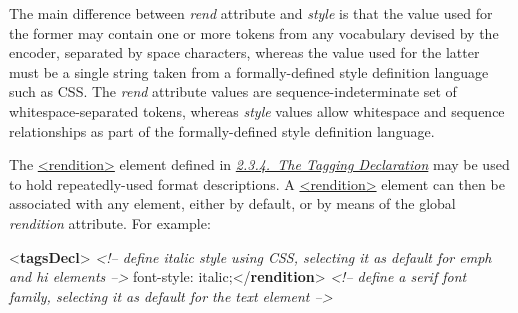 The main difference between {\itshape rend} attribute and {\itshape style} is that the value used for the former may contain one or more tokens from any vocabulary devised by the encoder, separated by space characters, whereas the value used for the latter must be a single string taken from a formally-defined style definition language such as CSS. The {\itshape rend} attribute values are sequence-indeterminate set of whitespace-separated tokens, whereas {\itshape style} values allow whitespace and sequence relationships as part of the formally-defined style definition language.\par
The \hyperref[TEI.rendition]{<rendition>} element defined in \textit{\hyperref[HD57]{2.3.4.\ The Tagging Declaration}} may be used to hold repeatedly-used format descriptions. A \hyperref[TEI.rendition]{<rendition>} element can then be associated with any element, either by default, or by means of the global {\itshape rendition} attribute. For example: \par\bgroup{}\exampleFont \begin{shaded}\noindent\mbox{}{<\textbf{tagsDecl}>}\mbox{}\newline 
\textit{<!-- define italic style using CSS, selecting it as default for emph and hi elements -->}\mbox{}\newline 
{}font-style: italic;{</\textbf{rendition}>}\mbox{}\newline 
\textit{<!-- define a serif font family, selecting it as default for the text element -->}\mbox{}\newline 
{}
\end{shaded}
